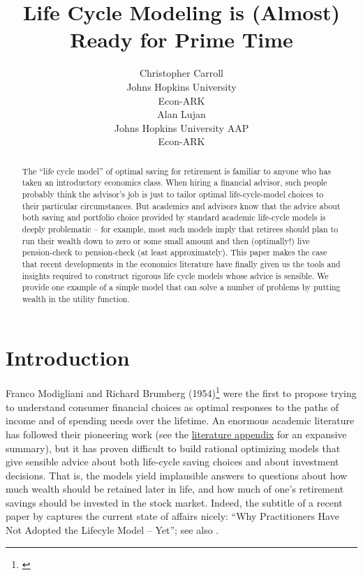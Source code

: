 \documentclass{article}
\title{Life Cycle Modeling is (Almost) \\ Ready for Prime Time}
\date{\displaydate{articleDate}}
\author{Christopher Carroll\footnotemark[1]\\
Johns Hopkins University\\Econ-ARK\\\AND
Alan Lujan\\
Johns Hopkins University AAP\\Econ-ARK\\}
\begin{document}
\maketitle
{}

\begin{abstract}
The ``life cycle model'' of optimal saving for retirement is familiar to anyone who has taken an introductory economics class.
When hiring a financial advisor, such people probably think the advisor's job is just to tailor optimal life-cycle-model choices to their particular circumstances.
But academics and advisors know that the advice about both saving and portfolio choice provided by standard academic life-cycle models is deeply problematic -- for example, most such models imply that retirees should plan to run their wealth down to zero or some small amount and then (optimally!) live pension-check to pension-check (at least approximately).
This paper makes the case that recent developments in the economics literature have finally given us the tools and insights required to construct rigorous life cycle models whose advice is sensible.
We provide one example of a simple model that can solve a number of problems by putting wealth in the utility function.
\end{abstract}

\keywords{}

\section{Introduction}

Franco Modigliani and Richard Brumberg (1954)\footnote{\cite{2005}} were the first to propose trying to understand consumer financial choices as optimal responses to the paths of income and of spending needs over the lifetime.
An enormous academic literature has followed their pioneering work (see the \href{/lit-review}{literature appendix} for an expansive summary),
but it has proven difficult to build rational optimizing models that give sensible advice about both life-cycle saving choices and about investment decisions.
That is, the models yield implausible answers to questions about how much wealth should be retained later in life, and how much of one's retirement savings should be invested in the stock market.
Indeed, the subtitle of a recent paper by \cite{Daga_2023} captures the current state of affairs nicely: ``Why Practitioners Have Not Adopted the Lifecyle Model -- Yet''; see also \cite{DeNardi2016d}.
\end{document}
